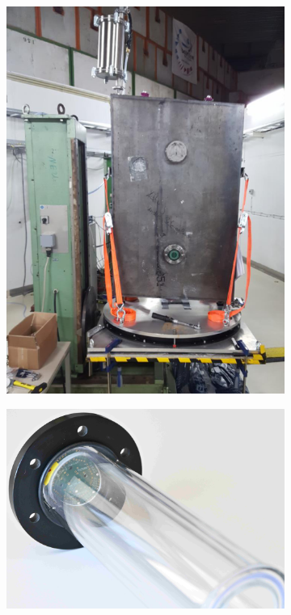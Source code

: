 \begin{figure}
	\centering
	\begin{subfigure}[b]{.40\textwidth}
		\centering
		\includegraphics[width=1.\textwidth]{pictures/one_cell}
		\caption[One Cell Prototype]{}
		\label{fig:one_cell}
	\end{subfigure}
	\begin{subfigure}[b]{.54\textwidth}
		\centering
		\includegraphics[width=1.\textwidth]{pictures/pmma_vessel}

\end{subfigure}
\end{figure}

